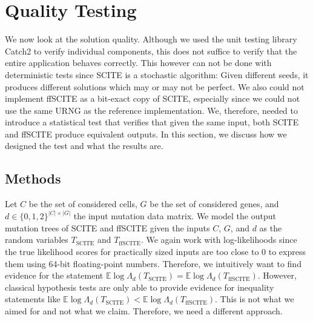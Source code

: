 \section{Quality Testing}
\label{sec:quality test}

We now look at the solution quality. Although we used the unit testing library Catch2 to verify individual components, this does not suffice to verify that the entire application behaves correctly. This however can not be done with deterministic tests since \ac{SCITE} is a stochastic algorithm: Given different seeds, it produces different solutions which may or may not be perfect. We also could not implement \ac{ffSCITE} as a bit-exact copy of \ac{SCITE}, especially since we could not use the same \ac{URNG} as the reference implementation. We, therefore, needed to introduce a statistical test that verifies that given the same input, both \ac{SCITE} and \ac{ffSCITE} produce equivalent outputs. In this section, we discuss how we designed the test and what the results are.

\subsection{Methods}

Let $C$ be the set of considered cells, $G$ be the set of considered genes, and $d \in \{0,1,2\}^{|C| \times |G|}$ the input mutation data matrix. We model the output mutation trees of \ac{SCITE} and \ac{ffSCITE} given the inputs $C$, $G$, and $d$ as the random variables $T_\mathrm{SCITE}$ and $T_\mathrm{ffSCITE}$. We again work with log-likelihoods since the true likelihood scores for practically sized inputs are too close to 0 to express them using 64-bit floating-point numbers. Therefore, we intuitively want to find evidence for the statement $\mathbb{E} \log\Lambda_d(T_\mathrm{SCITE}) = \mathbb{E} \log\Lambda_d(T_\mathrm{ffSCITE})$. However, classical hypothesis tests are only able to provide evidence for inequality statements like $\mathbb{E} \log\Lambda_d(T_\mathrm{SCITE}) < \mathbb{E} \log\Lambda_d(T_\mathrm{ffSCITE})$. This is not what we aimed for and not what we claim. Therefore, we need a different approach.

